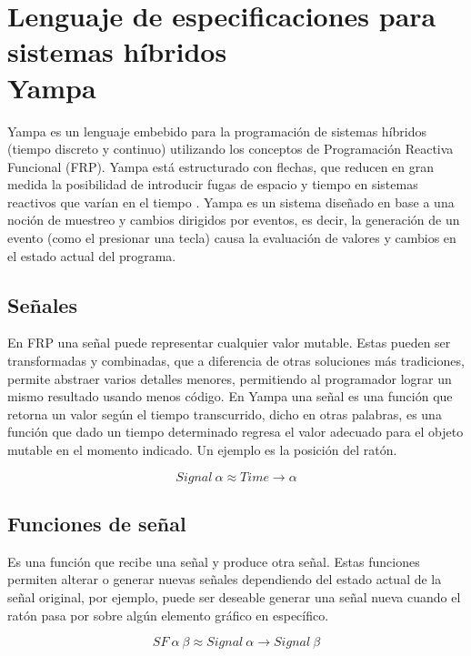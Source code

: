 \section{Lenguaje de especificaciones para sistemas híbridos\\ Yampa}

Yampa es un lenguaje embebido para la programación de sistemas híbridos (tiempo discreto y continuo) utilizando los conceptos de Programación Reactiva Funcional (FRP). Yampa está estructurado con flechas, que reducen en gran medida la posibilidad de introducir fugas de espacio y tiempo en sistemas reactivos que varían en el tiempo \cite{wiki:Yampa}. Yampa es un sistema diseñado en base a una noción de muestreo y cambios dirigidos por eventos, es decir, la generación de un evento (como el presionar una tecla) causa la evaluación de valores y cambios en el estado actual del programa.

\subsection{Señales}
En FRP una señal puede representar cualquier valor mutable. Estas pueden ser transformadas y combinadas, que a diferencia de otras soluciones más tradiciones, permite abstraer varios detalles menores, permitiendo al programador lograr un mismo resultado usando menos código. En Yampa una señal es una función que retorna un valor según el tiempo transcurrido, dicho en otras palabras, es una función que dado un tiempo determinado regresa el valor adecuado para el objeto mutable en el momento indicado. Un ejemplo es la posición del ratón.

\begin{equation}
Signal \ \alpha \approx Time \rightarrow \alpha
\end{equation}

\subsection{Funciones de señal}
Es una función que recibe una señal y produce otra señal. Estas funciones permiten alterar o generar nuevas señales dependiendo del estado actual de la señal original, por ejemplo, puede ser deseable generar una señal nueva cuando el ratón pasa por sobre algún elemento gráfico en específico.

\begin{equation}
SF \ \alpha \ \beta \approx Signal \ \alpha \rightarrow Signal \ \beta
\end{equation}

